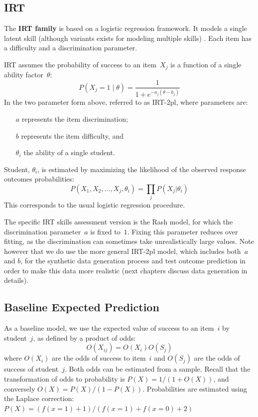 \subsection{IRT} 

The \textbf{IRT family} is based on a logistic regression framework. It models a single latent skill (although variants exists for modeling multiple skills) \cite{bakerKim2004}.  Each item has a difficulty and a discrimination parameter.

IRT assumes the probability of success to an item~$X_j$ is a function of a single ability factor~$\theta$: 
\[P(X_j\!=\!1\;|\;\theta) = \frac{1}{1+e^{-a_j(\theta-b_j)}}\]
In the two parameter form above, referred to as IRT-2pl, where parameters are:

\begin{itemize}
\item[$a$] represents the item discrimination;
\item [$b$] represents the item difficulty, and
\item [$\theta_i$] the ability of a single student.
\end{itemize}

Student, $\theta_i$, is estimated by maximizing the likelihood of the observed response outcomes probabilities:
\[ P(X_1, X_2, ..., X_j, \theta_i) = \prod_j P(X_j|\theta_i) \]
This corresponds to the usual logistic regression procedure.

The specific IRT skills assessment version is the Rash model, for which the discrimination parameter~$a$ is fixed to~$1$.  Fixing this parameter reduces over fitting, as the discrimination can sometimes take unrealistically large values. Note however that we do use the more general IRT-2pl model, which includes both~$a$ and $b$, for the synthetic data generation process and test outcome prediction in order to make this data more realistic (next chapters discuss data generation in details).

\subsection{Baseline Expected Prediction}

As a baseline model, we use the expected value of success to an item~$i$ by student~$j$, as defined by a product of odds:
\[ O(X_{ij}) =  O(X_i) O(S_j) \]
where $O(X_i)$ are the odds of success to item~$i$ and $O(S_j)$ are the odds of success of student~$j$.  Both odds can be estimated from a sample.  Recall that the transformation of odds to probability is $P(X) = 1/(1+O(X))$, and conversely $O(X) = P(X)/(1 - P(X))$. Probabilities are estimated using the Laplace correction: $P(X) = (f(x\!=\!1) + 1) / (f(x\!=\!1) + f(x\!=\!0) + 2)$


